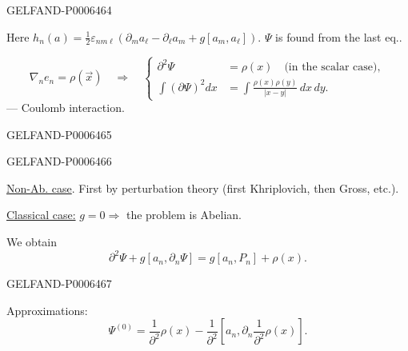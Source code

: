 \begin{GelfandAdjacentEvidence}{GELFAND-P000646}{4}


Here \(h_n(a)=\frac12\varepsilon_{nm\ell}(\partial_m a_\ell-\partial_\ell a_m+g[a_m,a_\ell])\).
\(\Psi\) is found from the last eq..

\[
\nabla_n e_n=\rho(\vec x)\quad\Rightarrow\quad
\left\{\begin{aligned}
\partial^2\Psi&=\rho(x)\quad\text{(in the scalar case)},\\
\int(\partial\Psi)^2dx&=\int\frac{\rho(x)\rho(y)}{|x-y|}\,dx\,dy.
\end{aligned}\right.
\]
--- Coulomb interaction.
\end{GelfandAdjacentEvidence}
\begin{GelfandAdjacentEvidence}{GELFAND-P000646}{5}

\end{GelfandAdjacentEvidence}
\begin{GelfandAdjacentEvidence}{GELFAND-P000646}{6}


\underline{Non-Ab. case}. First by perturbation theory (first Khriplovich, then Gross, etc.).

\underline{Classical case:} \(g=0\Rightarrow\) the problem is Abelian.

We obtain
\[
\partial^2\Psi+g[a_n,\partial_n\Psi]=g[a_n,P_n]+\rho(x).
\]
\end{GelfandAdjacentEvidence}
\begin{GelfandAdjacentEvidence}{GELFAND-P000646}{7}


Approximations:
\[
\Psi^{(0)}=\frac1{\partial^2}\rho(x)
-\frac1{\partial^2}\left[a_n,\partial_n\frac1{\partial^2}\rho(x)\right].
\]
\end{GelfandAdjacentEvidence}
